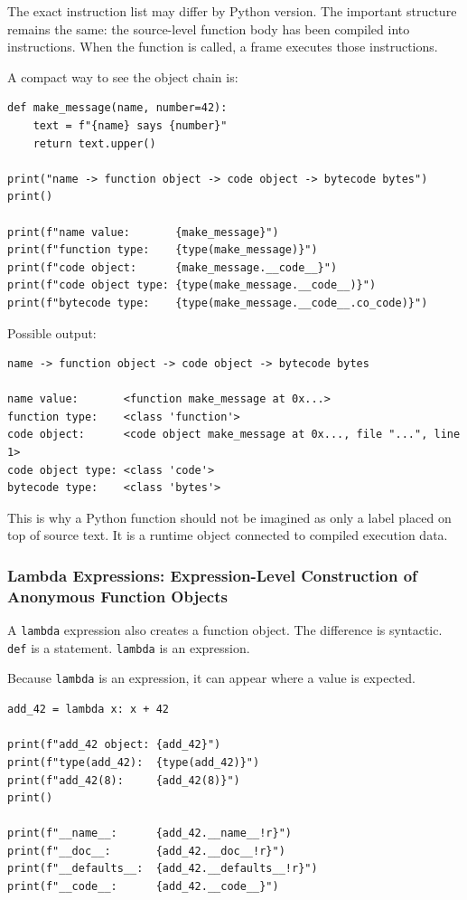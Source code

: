 The exact instruction list may differ by Python version. The important structure remains the same: the source-level function body has been compiled into instructions. When the function is called, a frame executes those instructions.

A compact way to see the object chain is:

\begin{verbatim}
def make_message(name, number=42):
    text = f"{name} says {number}"
    return text.upper()

print("name -> function object -> code object -> bytecode bytes")
print()

print(f"name value:       {make_message}")
print(f"function type:    {type(make_message)}")
print(f"code object:      {make_message.__code__}")
print(f"code object type: {type(make_message.__code__)}")
print(f"bytecode type:    {type(make_message.__code__.co_code)}")
\end{verbatim}

Possible output:

\begin{verbatim}
name -> function object -> code object -> bytecode bytes

name value:       <function make_message at 0x...>
function type:    <class 'function'>
code object:      <code object make_message at 0x..., file "...", line 1>
code object type: <class 'code'>
bytecode type:    <class 'bytes'>
\end{verbatim}

This is why a Python function should not be imagined as only a label placed on top of source text. It is a runtime object connected to compiled execution data.

\subsubsection{Lambda Expressions: Expression-Level Construction of Anonymous Function Objects}

A \texttt{lambda} expression also creates a function object. The difference is syntactic. \texttt{def} is a statement. \texttt{lambda} is an expression.

Because \texttt{lambda} is an expression, it can appear where a value is expected.

\begin{verbatim}
add_42 = lambda x: x + 42

print(f"add_42 object: {add_42}")
print(f"type(add_42):  {type(add_42)}")
print(f"add_42(8):     {add_42(8)}")
print()

print(f"__name__:      {add_42.__name__!r}")
print(f"__doc__:       {add_42.__doc__!r}")
print(f"__defaults__:  {add_42.__defaults__!r}")
print(f"__code__:      {add_42.__code__}")
\end{verbatim}

